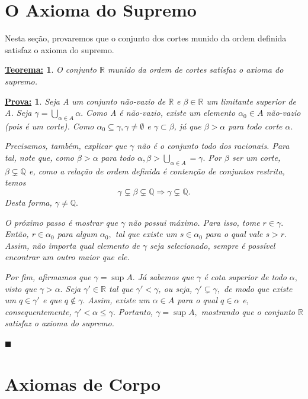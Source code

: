 \documentclass{article}
\newtheorem*{theorem*}{\underline{Teorema:}}
\newtheorem*{proof*}{\underline{Prova:}}
\renewcommand\qedsymbol{$\blacksquare$}
\begin{document}
\section{O Axioma do Supremo}
Nesta se\c c\~ao, provaremos que o conjunto dos cortes munido da ordem definida satisfaz o axioma do supremo.
\begin{theorem*}
O conjunto $\mathbb{R}$ munido da ordem de cortes satisfaz o axioma do supremo.
\end{theorem*}
\begin{proof*}
Seja A um conjunto n\~ao-vazio de $\mathbb{R}$ e $\beta\in\mathbb{R}$ um limitante superior de A. Seja $\gamma=\bigcup_{\alpha\in{A}}\alpha.$ Como A \'e n\~ao-vazio, existe um elemento $\alpha_0\in{A}$ n\~ao-vazio (pois \'e um corte). Como $\alpha_0\subseteq\gamma, \gamma\neq\emptyset$ e $\gamma\subset\beta$, j\'a que $\beta > \alpha$ para todo corte $\alpha.$

Precisamos, tamb\'em, explicar que $\gamma$ n\~ao \'e o conjunto todo dos racionais. Para tal, note que, como $\beta > \alpha$ para todo $\alpha, \beta > \bigcup_{\alpha\in{A}} = \gamma.$ Por $\beta$ ser um corte, $\beta\subsetneq\mathbb{Q}$ e, como a rela\c c\~ao de ordem definida \'e conten\c c\~ao de conjuntos restrita, temos 
$$ 
\gamma \subsetneq \beta \subsetneq \mathbb{Q} \Rightarrow \gamma\subsetneq\mathbb{Q}.
$$
Desta forma, $\gamma\neq\mathbb{Q}.$ 

O pr\'oximo passo \'e mostrar que $\gamma$ n\~ao possui m\'aximo. Para isso, tome $r\in\gamma.$ Ent\~ao, $r\in\alpha_0$ para algum $\alpha_0,$ tal que existe um $s\in\alpha_0$ para o qual vale $s > r.$ Assim, n\~ao importa qual elemento de $\gamma$ seja selecionado, sempre \'e poss\'ivel encontrar um outro maior que ele.

Por fim, afirmamos que $\gamma = \sup{A}.$ J\'a sabemos que $\gamma$ \'e cota superior de todo $\alpha,$ visto que $\gamma > \alpha.$ Seja $\gamma'\in\mathbb{R}$ tal que $\gamma' < \gamma$, ou seja, $\gamma' \subsetneq \gamma,$ de modo que existe um $q\in\gamma'$ e que $q\notin\gamma.$ Assim, existe um $\alpha\in{A}$ para o qual $q\in\alpha$ e, consequentemente, $\gamma' < \alpha \leq \gamma.$ Portanto, $\gamma=\sup{A},$ mostrando que o conjunto $\mathbb{R}$ satisfaz o axioma do supremo.
  
\qedsymbol
\end{proof*}

\section{Axiomas de Corpo}
\end{document}
